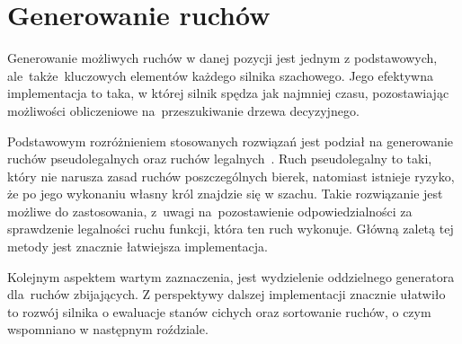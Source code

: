 \section{Generowanie ruchów}
\label{sec:generowanie-ruchow}

Generowanie możliwych ruchów w danej pozycji jest jednym z podstawowych, ale~także~kluczowych elementów każdego silnika szachowego.
Jego efektywna implementacja to taka, w której silnik spędza jak najmniej czasu, pozostawiając możliwości obliczeniowe na~przeszukiwanie drzewa decyzyjnego.

Podstawowym rozróżnieniem stosowanych rozwiązań jest podział na generowanie ruchów pseudolegalnych oraz ruchów legalnych~\cite*{wiki-movegen}.
Ruch pseudolegalny to taki, który nie narusza zasad ruchów poszczególnych bierek, natomiast istnieje ryzyko, że po jego wykonaniu własny król znajdzie się w szachu.
Takie rozwiązanie jest możliwe do zastosowania, z~uwagi na~pozostawienie odpowiedzialności za sprawdzenie legalności ruchu funkcji, która ten ruch wykonuje.
Główną zaletą tej metody jest znacznie łatwiejsza implementacja.

Kolejnym aspektem wartym zaznaczenia, jest wydzielenie oddzielnego generatora dla~ruchów zbijających.
Z perspektywy dalszej implementacji znacznie ułatwiło to rozwój silnika o ewaluacje stanów cichych oraz sortowanie ruchów, o czym wspomniano w następnym roździale.




